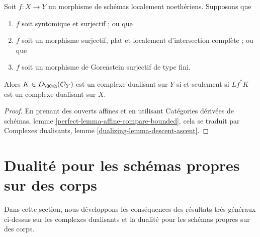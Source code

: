 \begin{lemma}
\label{lemma-descent-ascent}
Soit $f : X \to Y$ un morphisme de schémas localement noethériens. Supposons que
\begin{enumerate}
\item $f$ soit syntomique et surjectif ; ou que
\item $f$ soit un morphisme surjectif, plat et localement d'intersection complète ; ou que
\item $f$ soit un morphisme de Gorenstein surjectif de type fini.
\end{enumerate}
Alors $K \in D_\QCoh(\mathcal{O}_Y)$ est un complexe dualisant sur $Y$ si et seulement si $Lf^*K$ est un complexe dualisant sur $X$.
\end{lemma}

\begin{proof}
En prenant des ouverts affines et en utilisant Catégories dérivées de schémas, lemme \ref{perfect-lemma-affine-compare-bounded}, cela se traduit par Complexes dualisants, lemme \ref{dualizing-lemma-descent-ascent}.
\end{proof}








\section{Dualité pour les schémas propres sur des corps}
\label{section-duality-proper-over-field}

\noindent
Dans cette section, nous développons les conséquences des résultats très généraux ci-dessus sur les complexes dualisants et la dualité pour les schémas propres sur des corps.

